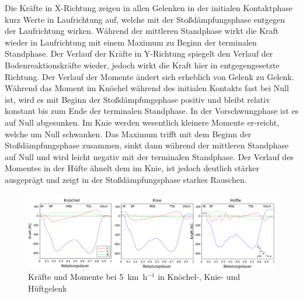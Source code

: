 Die Kräfte in X-Richtung zeigen in allen Gelenken in der initialen Kontaktphase kurz Werte in Laufrichtung auf, welche mit der Stoßdämpfungsphase entgegen der Laufrichtung wirken. Während der mittleren Standphase wirkt die Kraft wieder in Laufrichtung mit einem Maximum zu Beginn der terminalen Standphase. Der Verlauf der Kräfte in Y-Richtung spiegelt den Verlauf der Bodenreaktionskräfte wieder, jedoch wirkt die Kraft hier in entgegengesetzte Richtung. Der Verlauf der Momente ändert sich erheblich von Gelenk zu Gelenk. Während das Moment im Knöchel während des initialen Kontakts fast bei Null ist, wird es mit Beginn der Stoßdämpfungsphase positiv und bleibt relativ konstant bis zum Ende der terminalen Standphase. In der Vorschwungphase ist es auf Null abgesunken. Im Knie werden wesentlich kleinere Momente er-reicht, welche um Null schwanken. Das Maximum trifft mit dem Beginn der Stoßdämpfungsphase zusammen, sinkt dann während der mittleren Standphase auf Null und wird leicht negativ mit der terminalen Standphase. Der Verlauf des Momentes in der Hüfte ähnelt dem im Knie, ist jedoch deutlich stärker ausgeprägt und zeigt in der Stoßdämpfungsphase starkes Rauschen.\\
\begin{figure}[h!]
	\centering
	\includegraphics[width=\linewidth]{bilder/Ergebnisse/ang_inv_kin}
	\caption{Kräfte und Momente bei 5~km~h$^{-1}$ in Knöchel-, Knie- und Hüftgelenk}
	\label{fig:ang_inv_kin}
\end{figure}

